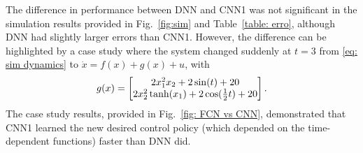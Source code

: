 \documentclass{l4dc2025}
\begin{document}
The difference in performance between DNN and CNN1 was not significant in the simulation results provided in Fig.~\ref{fig:sim} and Table~\ref{table: erro}, although DNN had slightly larger errors than CNN1. However, the difference can be highlighted by a case study where the system changed suddenly at $t=3$ from \eqref{eq: sim dynamics} to $\dot x = f(x)+g(x)+u$, with 
\begin{equation}
    g(x) = 
	\begin{bmatrix}
		2x_1^2x_2 + 2\sin(t)+20\\
		2x_2^2\tanh(x_1)+2\cos({1\over2}t)+20
	\end{bmatrix}.
\end{equation}
The case study results, provided in Fig.~\ref{fig: FCN vs CNN}, demonstrated that CNN1 learned the new desired control policy (which depended on the time-dependent functions) faster than DNN did.


\end{document}
